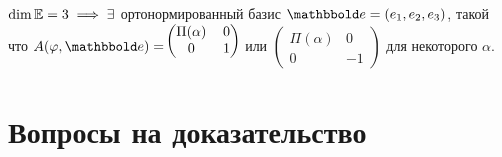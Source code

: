 \documentclass[a4paper]{article}
\begin{document}
\begin{colloq}
        \begin{corollary}
            $\dim \mathbb{E} = 3 \implies \exists$ ортонормированный базис $\E = (e_1, e_2, e_3)$, такой что
            \begin{math}
                A(\phi, \E) = \begin{blockarray}{(cc)}
                    \Pi(\alpha) & 0 \\
                    0 & 1
                \end{blockarray}
            \end{math}
            или
            \begin{math}
                \begin{pmatrix} 
                    \Pi(\alpha) & 0 \\
                    0 & -1
                \end{pmatrix}
            \end{math}
            для некоторого $\alpha$.
        \end{corollary}


    \end{colloq}


    \newpage
    \section{Вопросы на доказательство}
\end{document}
